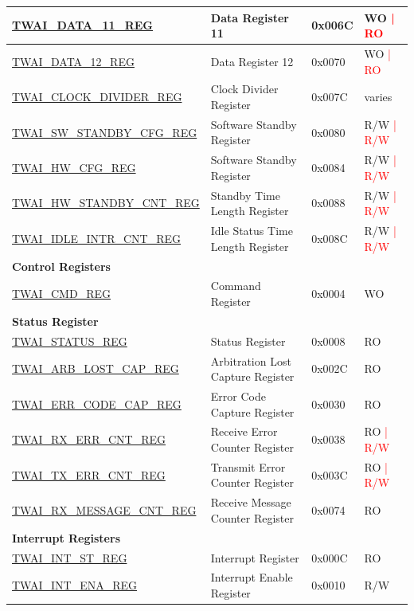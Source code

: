 \begin{longtable}{ | p{6cm} | p{6cm} | p{1.3cm} | p{2cm} | }
\hyperref[regdesc:TWAIDATA11REG]{TWAI\_DATA\_11\_REG} & Data Register 11 & 0x006C & WO \textcolor{red}{| RO} \\ \hline
\hyperref[regdesc:TWAIDATA12REG]{TWAI\_DATA\_12\_REG} & Data Register 12 & 0x0070 & WO \textcolor{red}{| RO} \\ \hline
\hyperref[regdesc:TWAICLOCKDIVIDERREG]{TWAI\_CLOCK\_DIVIDER\_REG} & Clock Divider Register & 0x007C & varies \\ \hline
\hyperref[regdesc:TWAISWSTANDBYCFGREG]{TWAI\_SW\_STANDBY\_CFG\_REG} & Software Standby Register & 0x0080 & R/W \textcolor{red}{| R/W} \\ \hline
\hyperref[regdesc:TWAIHWCFGREG]{TWAI\_HW\_CFG\_REG} & Software Standby Register & 0x0084 & R/W \textcolor{red}{| R/W} \\ \hline
\hyperref[regdesc:TWAIHWSTANDBYCNTREG]{TWAI\_HW\_STANDBY\_CNT\_REG} & Standby Time Length Register & 0x0088 & R/W \textcolor{red}{| R/W} \\ \hline
\hyperref[regdesc:TWAIIDLEINTRCNTREG]{TWAI\_IDLE\_INTR\_CNT\_REG} & Idle Status Time Length Register & 0x008C & R/W \textcolor{red}{| R/W} \\ \hline
\multicolumn{4}{|l|}{\textbf{Control Registers}} \\ \hline
\hyperref[regdesc:TWAICMDREG]{TWAI\_CMD\_REG} & Command Register & 0x0004 & WO \\ \hline
\multicolumn{4}{|l|}{\textbf{Status Register}} \\ \hline
\hyperref[regdesc:TWAISTATUSREG]{TWAI\_STATUS\_REG} & Status Register & 0x0008 & RO \\ \hline
\hyperref[regdesc:TWAIARBLOSTCAPREG]{TWAI\_ARB\_LOST\_CAP\_REG} & Arbitration Lost Capture Register & 0x002C & RO \\ \hline
\hyperref[regdesc:TWAIERRCODECAPREG]{TWAI\_ERR\_CODE\_CAP\_REG} & Error Code Capture Register & 0x0030 & RO \\ \hline
\hyperref[regdesc:TWAIRXERRCNTREG]{TWAI\_RX\_ERR\_CNT\_REG} & Receive Error Counter Register & 0x0038 & RO \textcolor{red}{| R/W} \\ \hline
\hyperref[regdesc:TWAITXERRCNTREG]{TWAI\_TX\_ERR\_CNT\_REG} & Transmit Error Counter Register & 0x003C & RO \textcolor{red}{| R/W} \\ \hline
\hyperref[regdesc:TWAIRXMESSAGECNTREG]{TWAI\_RX\_MESSAGE\_CNT\_REG} & Receive Message Counter Register & 0x0074 & RO \\ \hline
\multicolumn{4}{|l|}{\textbf{Interrupt Registers}} \\ \hline
\hyperref[regdesc:TWAIINTSTREG]{TWAI\_INT\_ST\_REG} & Interrupt Register & 0x000C & RO \\ \hline
\hyperref[regdesc:TWAIINTENAREG]{TWAI\_INT\_ENA\_REG} & Interrupt Enable Register & 0x0010 & R/W \\ \hline
\end{longtable}
